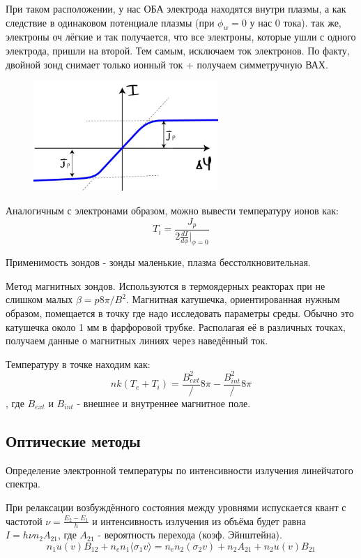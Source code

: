 \documentclass[10pt, a4paper]{article}
\begin{document}
При таком расположении, у нас ОБА электрода находятся внутри плазмы, а как следствие в одинаковом потенциале плазмы (при $\phi_w=0$ у нас 0 тока). так же, электроны оч лёгкие и так получается, что все электроны, которые ушли с одного электрода, пришли на второй. Тем самым, исключаем ток электронов. По факту, двойной зонд снимает только ионный ток + получаем симметручную ВАХ.
\begin{figure}[ht]
	\begin{center}
		\includegraphics[width=70mm]{VaH_zonda_2.JPG}
	\end{center}
\end{figure}
Аналогичным с электронами образом, можно вывести температуру ионов как:
\begin{equation}
	T_i= \frac{J_p}{2 \frac{d I}{d \phi} |_{\phi=0}}
\end{equation}

Применимость зондов - зонды маленькие, плазма бесстолкновительная.

Метод магнитных зондов.
Используются в термоядерных реакторах при не слишком малых $\beta=p8\pi/B^2$. Магнитная катушечка, ориентированная нужным образом, помещается в точку где надо исследовать параметры среды. Обычно это катушечка около 1 мм в фарфоровой трубке. Располагая её в различных точках, получаем данные о магнитных линиях через наведённый ток.

Температуру в точке находим как:
\begin{equation}
	n k(T_e + T_i)= \frac{B_{ext}^2}/{8 \pi} - \frac{B_{int}^2}/{8 \pi}
\end{equation}
, где $B_{ext}$ и $B_{int}$ - внешнее и внутреннее магнитное поле.
 

\subsection{Оптические методы}

Определение электронной температуры по интенсивности излучения линейчатого спектра.

При релаксации возбуждённого состояния между уровнями испускается квант с частотой $\nu=\frac{E_2-E_1}{h}$ и интенсивность излучения из объёма будет равна $I=h\nu n_{2} A_{21}$, где $A_{21}$ - вероятность перехода (коэф. Эйнштейна).
\begin{equation}
	n_1 u(v)B_{12}+n_e n_1 \langle\sigma_1 v\rangle=n_e n_2 (\sigma_2 v) + n_2 A_{21}+n_2 u(v) B_{21}
\end{equation}
\end{document}
